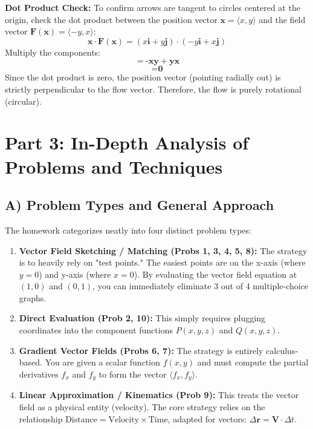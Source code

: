 \documentclass[11pt]{article}
\begin{document}
\textbf{Dot Product Check:}
To confirm arrows are tangent to circles centered at the origin, check the dot product between the position vector $\mathbf{x} = \langle x, y \rangle$ and the field vector $\mathbf{F}(\mathbf{x}) = \langle -y, x \rangle$:
\[ \mathbf{x} \cdot \mathbf{F}(\mathbf{x}) = (x\mathbf{i} + y\mathbf{j}) \cdot (-y\mathbf{i} + x\mathbf{j}) \]
Multiply the components:
\[ = \textbf{-xy} + \textbf{yx} \]
\[ = \textbf{0} \]
Since the dot product is zero, the position vector (pointing radially out) is strictly perpendicular to the flow vector. Therefore, the flow is purely rotational (circular).

\section{Part 3: In-Depth Analysis of Problems and Techniques}

\subsection{A) Problem Types and General Approach}
The homework categorizes neatly into four distinct problem types:
\begin{enumerate}
    \item \textbf{Vector Field Sketching / Matching (Probs 1, 3, 4, 5, 8):} The strategy is to heavily rely on "test points." The easiest points are on the x-axis (where $y=0$) and y-axis (where $x=0$). By evaluating the vector field equation at $(1,0)$ and $(0,1)$, you can immediately eliminate 3 out of 4 multiple-choice graphs.
    \item \textbf{Direct Evaluation (Prob 2, 10):} This simply requires plugging coordinates into the component functions $P(x,y,z)$ and $Q(x,y,z)$. 
    \item \textbf{Gradient Vector Fields (Probs 6, 7):} The strategy is entirely calculus-based. You are given a scalar function $f(x,y)$ and must compute the partial derivatives $f_x$ and $f_y$ to form the vector $\langle f_x, f_y \rangle$.
    \item \textbf{Linear Approximation / Kinematics (Prob 9):} This treats the vector field as a physical entity (velocity). The core strategy relies on the relationship $\text{Distance} = \text{Velocity} \times \text{Time}$, adapted for vectors: $\Delta \mathbf{r} = \mathbf{V} \cdot \Delta t$.
\end{enumerate}
\end{document}

